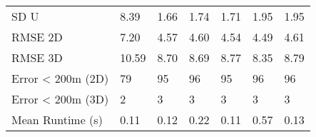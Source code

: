 \begin{longtable}{lllllll}
SD U              &       8.39 &       1.66 &      1.74 &     1.71 &     1.95 &        1.95 \\
RMSE 2D           &       7.20 &       4.57 &      4.60 &     4.54 &     4.49 &        4.61 \\
RMSE 3D           &      10.59 &       8.70 &      8.69 &     8.77 &     8.35 &        8.79 \\
Error < 200m (2D) &         79 &         95 &        96 &       95 &       96 &          96 \\
Error < 200m (3D) &          2 &          3 &         3 &        3 &        3 &           3 \\
Mean Runtime (s)  &       0.11 &       0.12 &      0.22 &     0.11 &     0.57 &        0.13 \\
\end{longtable}
